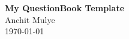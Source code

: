 \begin{titlepage}
    \thispagestyle{empty} %
    \centering
    \vfill                %
    \begin{center}
        {\Huge \textbf{My QuestionBook Template}}\\
        \vspace{1cm}
        {\Large Anchit Mulye}\\
        \vspace{0.5cm}
        {\Large \today}
    \end{center}
    \vfill                %
\end{titlepage}
